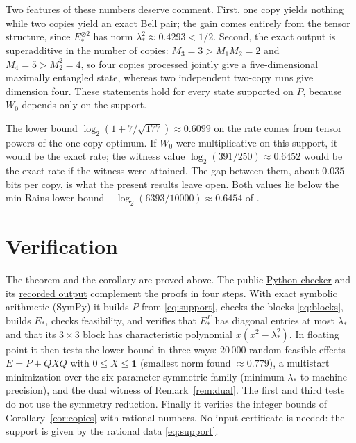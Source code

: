 \documentclass[11pt,a4paper]{article}
\theoremstyle{definition}
\theoremstyle{plain}
\newcommand{\one}{\mathbf{1}}
\begin{document}
Two features of these numbers deserve comment. First, one copy yields
nothing while two copies yield an exact Bell pair; the gain comes entirely
from the tensor structure, since $E_*^{\otimes2}$ has norm
$\lambda_*^2\approx0.4293<1/2$. Second, the exact output is superadditive in
the number of copies: $M_3=3>M_1M_2=2$ and $M_4=5>M_2^2=4$, so four copies
processed jointly give a five-dimensional maximally entangled state, whereas
two independent two-copy runs give dimension four. These statements hold for
every state supported on $P$, because $W_0$ depends only on the support.

The lower bound $\log_2(1+7/\sqrt{177})\approx0.6099$ on the rate comes from
tensor powers of the one-copy optimum. If $W_0$ were multiplicative on this
support, it would be the exact rate; the witness value
$\log_2(391/250)\approx0.6452$ would be the exact rate if the witness were
attained. The gap between them, about $0.035$ bits per copy, is what the
present results leave open. Both values lie below the min-Rains lower bound
$-\log_2(6393/10000)\approx0.6454$ of \cite{ZhuWang2026}.

\section{Verification}\label{sec:verification}
The theorem and the corollary are proved above. The public
\href{https://github.com/jpbruneton/open_quantum_problems/blob/main/research/entries/exact-ppt-distillation-qutrit/checks/verify_ppt_distillation.py}{Python checker}
and its
\href{https://github.com/jpbruneton/open_quantum_problems/blob/main/research/entries/exact-ppt-distillation-qutrit/data/verification.json}{recorded output}
complement the proofs in four steps. With exact symbolic arithmetic (SymPy) it
builds $P$ from \eqref{eq:support}, checks the blocks \eqref{eq:blocks}, builds
$E_*$, checks feasibility, and verifies that $E_*^\Gamma$ has diagonal
entries at most $\lambda_*$ and that its $3\times3$ block has characteristic
polynomial $x(x^2-\lambda_*^2)$. In floating point it then tests the lower
bound in three ways: $20\,000$ random feasible effects $E=P+QXQ$ with
$0\le X\le\one$ (smallest norm found $\approx0.779$), a multistart
minimization over the six-parameter symmetric family (minimum $\lambda_*$ to
machine precision), and the dual witness of Remark~\ref{rem:dual}. The
first and third tests do not use the symmetry reduction. Finally it
verifies the integer bounds of Corollary~\ref{cor:copies} with rational
numbers. No input certificate is needed: the support is given by the rational
data \eqref{eq:support}.
\end{document}
